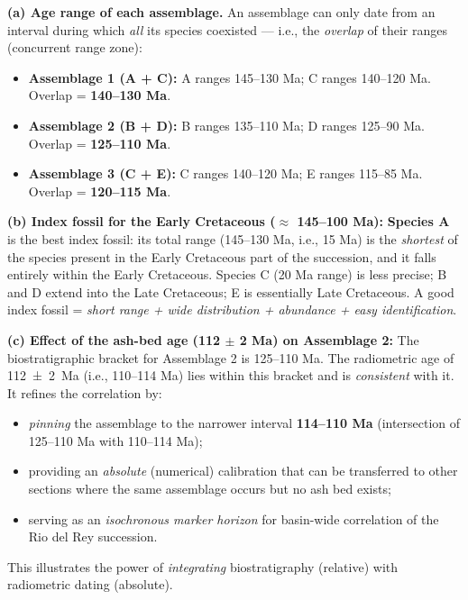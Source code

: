 \documentclass[11pt]{article}
\begin{document}
\begin{corrige}
\textbf{(a) Age range of each assemblage.} An assemblage can only date from an interval during which \emph{all} its species coexisted — i.e., the \emph{overlap} of their ranges (concurrent range zone):

\begin{itemize}
\item \textbf{Assemblage 1 (A + C):} A ranges 145--130 Ma; C ranges 140--120 Ma. Overlap = \textbf{140--130 Ma}.
\item \textbf{Assemblage 2 (B + D):} B ranges 135--110 Ma; D ranges 125--90 Ma. Overlap = \textbf{125--110 Ma}.
\item \textbf{Assemblage 3 (C + E):} C ranges 140--120 Ma; E ranges 115--85 Ma. Overlap = \textbf{120--115 Ma}.
\end{itemize}

\textbf{(b) Index fossil for the Early Cretaceous ($\approx$ 145--100 Ma):} \textbf{Species A} is the best index fossil: its total range (145--130 Ma, i.e., 15 Ma) is the \emph{shortest} of the species present in the Early Cretaceous part of the succession, and it falls entirely within the Early Cretaceous. Species C (20 Ma range) is less precise; B and D extend into the Late Cretaceous; E is essentially Late Cretaceous. A good index fossil = \emph{short range + wide distribution + abundance + easy identification}.

\textbf{(c) Effect of the ash-bed age (112 $\pm$ 2 Ma) on Assemblage 2:} The biostratigraphic bracket for Assemblage 2 is 125--110 Ma. The radiometric age of \SI{112 \pm 2}{Ma} (i.e., 110--114 Ma) lies within this bracket and is \emph{consistent} with it. It refines the correlation by:
\begin{itemize}
\item \emph{pinning} the assemblage to the narrower interval \textbf{114--110 Ma} (intersection of 125--110 Ma with 110--114 Ma);
\item providing an \emph{absolute} (numerical) calibration that can be transferred to other sections where the same assemblage occurs but no ash bed exists;
\item serving as an \emph{isochronous marker horizon} for basin-wide correlation of the Rio del Rey succession.
\end{itemize}
This illustrates the power of \emph{integrating} biostratigraphy (relative) with radiometric dating (absolute).
\end{corrige}
\end{document}
